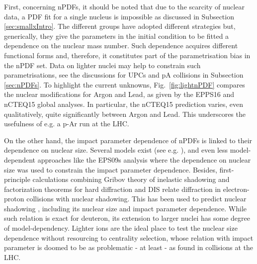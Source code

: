 \documentclass[../report.tex]{subfiles}
\begin{document}
First, concerning nPDFs, it should be noted that due to the scarcity of nuclear data, a PDF fit for a single nucleus is impossible as discussed in Subsection \ref{sec:smallxIntro}. The different groups \cite{deFlorian:2011fp,Kovarik:2015cma,Eskola:2016oht}  have adopted different strategies but, generically, they give the parameters in the initial condition to be fitted a dependence on the nuclear mass number. Such dependence acquires different functional forms and, therefore, it constitutes part of the parametrisation bias in the nPDF set. Data on lighter nuclei may help to constrain such parametrisations, see the discussions for UPCs and pA collisions in Subsection \ref{sec:nPDFs}. To highlight the current unknowns, Fig.~\ref{fig:lightnPDF} compares the nuclear modifications for Argon and Lead, as given by the EPPS16 and nCTEQ15 global analyses. In particular, the nCTEQ15 prediction varies, even qualitatively, quite significantly between Argon and Lead. This underscores the usefulness of e.g. a p-Ar run at the LHC.  

On the other hand, the impact parameter dependence of nPDFs is linked to their dependence on nuclear size. Several models exist (see e.g. \cite{Emelyanov:1998phs,Ferreiro:2008wc}), and even less model-dependent approaches like the EPS09s analysis \cite{Helenius:2012wd} where the dependence on nuclear size was used to constrain the impact parameter dependence. Besides, first-principle calculations combining Gribov theory of inelastic shadowing and factorization theorems for hard diffraction and DIS relate diffraction in electron-proton collisions with nuclear shadowing. This has been used to predict nuclear shadowing \cite{Frankfurt:2011cs,Armesto:2003fi}, including its nuclear size and impact parameter dependence. While such relation is exact for deuteron, its extension to larger nuclei has some degree of model-dependency. Lighter ions are the ideal place to test the nuclear size dependence without resourcing to centrality selection, whose relation with impact parameter is doomed to be as problematic - at least - as found in \pPb collisions at the LHC.
\end{document}
